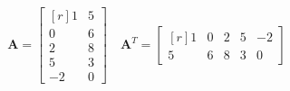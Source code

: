 \documentclass[12 pt]{slides}
\begin{document}
\begingroup
\[\textbf{A} = \begin{bmatrix*}[r]1 & 5\\0 & 6\\2 & 8\\5 & 3\\-2 & 0\end{bmatrix*}
	\quad \textbf{A}^T = \begin{bmatrix*}[r]1 & 0 & 2 & 5 & -2\\5 & 6 & 8 & 3 & 0
    \end{bmatrix*}\]
\endgroup
\end{document}
